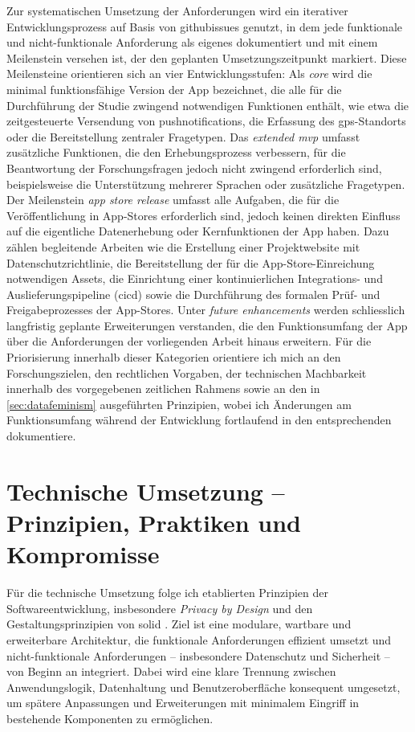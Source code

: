 Zur systematischen Umsetzung der Anforderungen wird ein iterativer Entwicklungsprozess auf Basis von \glspl{githubissue} genutzt, in dem jede funktionale und nicht-funktionale Anforderung als eigenes  dokumentiert und mit einem Meilenstein versehen ist, der den geplanten Umsetzungszeitpunkt markiert. Diese Meilensteine orientieren sich an vier Entwicklungsstufen: Als \textit{core } wird die minimal funktionsfähige Version der App bezeichnet, die alle für die Durchführung der Studie zwingend notwendigen Funktionen enthält, wie etwa die zeitgesteuerte Versendung von \glspl{pushnotification}, die Erfassung des \gls{gps}-Standorts oder die Bereitstellung zentraler Fragetypen. Das \textit{extended \gls{mvp}} umfasst zusätzliche Funktionen, die den Erhebungsprozess verbessern, für die Beantwortung der Forschungsfragen jedoch nicht zwingend erforderlich sind, beispielsweise die Unterstützung mehrerer Sprachen oder zusätzliche Fragetypen. Der Meilenstein \textit{app store release} umfasst alle Aufgaben, die für die Veröffentlichung in App-Stores erforderlich sind, jedoch keinen direkten Einfluss auf die eigentliche Datenerhebung oder Kernfunktionen der App haben. Dazu zählen begleitende Arbeiten wie die Erstellung einer Projektwebsite mit Datenschutzrichtlinie, die Bereitstellung der für die App-Store-Einreichung notwendigen Assets, die Einrichtung einer kontinuierlichen Integrations- und Auslieferungspipeline (\gls{cicd}) sowie die Durchführung des formalen Prüf- und Freigabeprozesses der App-Stores. Unter \textit{future enhancements} werden schliesslich langfristig geplante Erweiterungen verstanden, die den Funktionsumfang der App über die Anforderungen der vorliegenden Arbeit hinaus erweitern. Für die Priorisierung innerhalb dieser Kategorien orientiere ich mich an den Forschungszielen, den rechtlichen Vorgaben, der technischen Machbarkeit innerhalb des vorgegebenen zeitlichen Rahmens sowie an den in \cref{sec:datafeminism} ausgeführten Prinzipien, wobei ich Änderungen am Funktionsumfang während der Entwicklung fortlaufend in den entsprechenden  dokumentiere.


\section{Technische Umsetzung -- Prinzipien, Praktiken und Kompromisse}
\label{sec:app_entwicklung_technische_umsetzung}

Für die technische Umsetzung folge ich etablierten Prinzipien der Softwareentwicklung, insbesondere \textit{Privacy by Design} \parencite{cavoukianPrivacyDesign72009} und den Gestaltungsprinzipien von \gls{solid} \parencite{martinCleanArchitectureCraftsmans2018}. Ziel ist eine modulare, wartbare und erweiterbare Architektur, die funktionale Anforderungen effizient umsetzt und nicht-funktionale Anforderungen -- insbesondere Datenschutz und Sicherheit -- von Beginn an integriert. Dabei wird eine klare Trennung zwischen Anwendungslogik, Datenhaltung und Benutzeroberfläche konsequent umgesetzt, um spätere Anpassungen und Erweiterungen mit minimalem Eingriff in bestehende Komponenten zu ermöglichen.

